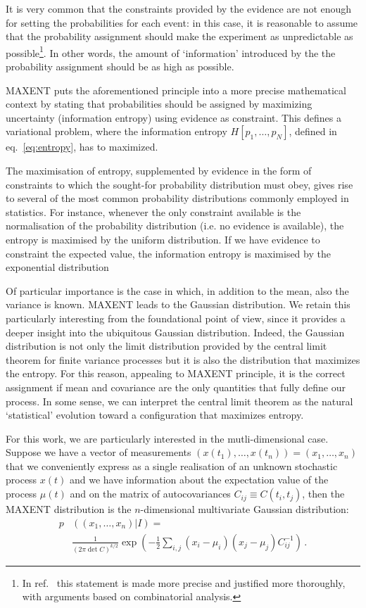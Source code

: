 \documentclass[twocolumn,showpacs,preprintnumbers,nofootinbib,prd,
superscriptaddress,10pt]{revtex4-1}
\begin{document}
It is very common that the constraints provided by the evidence are not enough for setting the probabilities for each event: in this case, it is reasonable to assume that the probability assignment should make the experiment as unpredictable as possible\footnote{
In ref.~\cite{Jaynes_MAXENT} this statement is made more precise and justified more thoroughly, with arguments based on combinatorial analysis.
}.
In other words, the amount of `information' introduced by the the probability assignment should be as high as possible.

MAXENT puts the aforementioned principle into a more precise mathematical context by stating that probabilities should be assigned by maximizing uncertainty (information entropy) using evidence as constraint. 
This defines a variational problem, where the information entropy $H\left[p_1, \dots, p_N\right]$, defined in eq.~\eqref{eq:entropy}, has to maximized. 

The maximisation of entropy, supplemented by evidence in the form of constraints to which the sought-for probability distribution must obey,
gives rise to several of the most common probability distributions commonly employed in statistics. For instance, whenever the only constraint available is the normalisation of the probability distribution (i.e. no evidence is available), the entropy is maximised by the uniform distribution. 
If we have evidence to constraint the expected value, the information entropy is maximised by the exponential distribution

Of particular importance is the case in which, in addition to the mean, also the variance is known. MAXENT leads to the Gaussian distribution. 
We retain this particularly interesting from the foundational point of view, since it provides a deeper insight into the ubiquitous Gaussian distribution.
Indeed, the Gaussian distribution is not only the limit distribution provided by the central limit theorem for finite variance processes but it is also the distribution that maximizes the entropy. For this reason, appealing to MAXENT principle, it is the correct assignment if mean and covariance are the only quantities that fully define our process. In some sense, we can interpret the central limit theorem as the natural `statistical' evolution toward a configuration that maximizes entropy.

For this work, we are particularly interested in the mutli-dimensional case. Suppose we have a vector of measurements $(x(t_1),\ldots,x(t_n)) = (x_1, \ldots, x_n)$ that we conveniently express as a single realisation of an unknown stochastic process $x(t)$ and we have information about the expectation value of the process $\mu(t)$ and on the matrix of autocovariances $C_{ij} \equiv C(t_i,t_j)$, then the MAXENT distribution is the $n$-dimensional multivariate Gaussian distribution\cite{gregory_2005}: 
\begin{align}
    p&\left((x_1, \ldots, x_n)\vert I\right) = \nonumber \\
    &\frac{1}{\left(2 \pi \det C\right)^{k / 2}}\exp\left(-\frac{1}{2}\sum_{i,j}(x_i-\mu_i) (x_j-\mu_j)C^{-1}_{ij} \right)\,. 
\end{align}
\end{document}
